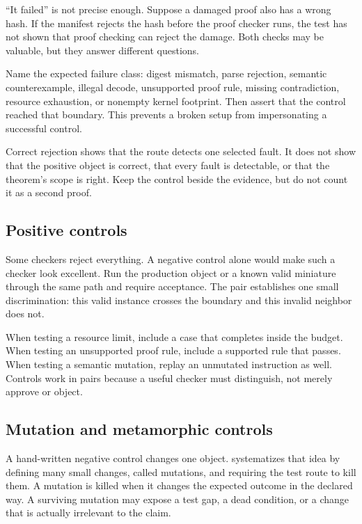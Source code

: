 ``It failed'' is not precise enough. Suppose a damaged proof also has a wrong
hash. If the manifest rejects the hash before the proof checker runs, the test
has not shown that proof checking can reject the damage. Both checks may be
valuable, but they answer different questions.

Name the expected failure class: digest mismatch, parse rejection, semantic
counterexample, illegal decode, unsupported proof rule, missing contradiction,
resource exhaustion, or nonempty kernel footprint. Then assert that the
control reached that boundary. This prevents a broken setup from impersonating
a successful control.

\begin{warning}[title={A negative control never supports the main claim}]
Correct rejection shows that the route detects one selected fault. It does not
show that the positive object is correct, that every fault is detectable, or
that the theorem's scope is right. Keep the control beside the evidence, but
do not count it as a second proof.
\end{warning}

\subsection{Positive controls}

Some checkers reject everything. A negative control alone would make such a
checker look excellent. Run the production object or a known valid miniature
through the same path and require acceptance. The pair establishes one small
discrimination: this valid instance crosses the boundary and this invalid
neighbor does not.

When testing a resource limit, include a case that completes inside the
budget. When testing an unsupported proof rule, include a supported rule that
passes. When testing a semantic mutation, replay an unmutated instruction as
well. Controls work in pairs because a useful checker must distinguish, not
merely approve or object.

\subsection{Mutation and metamorphic controls}

A hand-written negative control changes one object. 
systematizes that idea by defining many small changes, called mutations, and
requiring the test route to kill them. A mutation is killed when it changes the
expected outcome in the declared way. A surviving mutation may expose a test
gap, a dead condition, or a change that is actually irrelevant to the claim.

